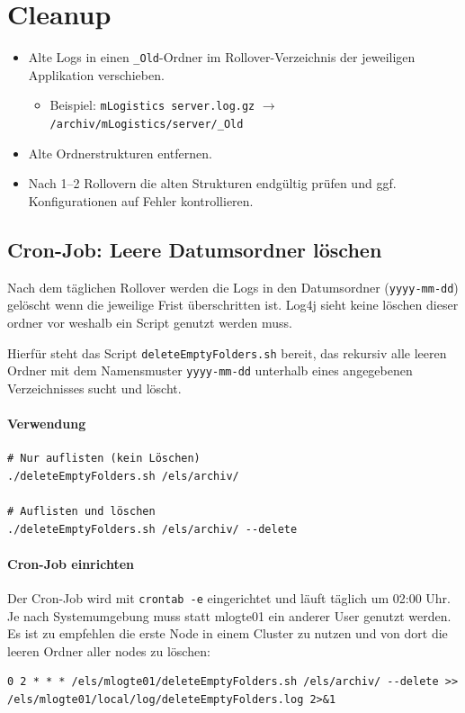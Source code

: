 \section{Cleanup}
\label{sec:cleanup}
\begin{itemize}
    \item Alte Logs in einen \texttt{\_Old}-Ordner im Rollover-Verzeichnis der jeweiligen Applikation verschieben.
    \begin{itemize}
        \item Beispiel: \texttt{mLogistics server.log.gz} $\rightarrow$ \texttt{/archiv/mLogistics/server/\_Old}
    \end{itemize}
    \item Alte Ordnerstrukturen entfernen.
    \item Nach 1–2 Rollovern die alten Strukturen endgültig prüfen und ggf. Konfigurationen auf Fehler kontrollieren.
\end{itemize}

\subsection{Cron-Job: Leere Datumsordner löschen}
Nach dem täglichen Rollover werden die Logs in den Datumsordner (\texttt{yyyy-mm-dd}) gelöscht wenn die jeweilige Frist überschritten ist.
Log4j sieht keine löschen dieser ordner vor weshalb ein Script genutzt werden muss.

Hierfür steht das Script \texttt{deleteEmptyFolders.sh} bereit, das rekursiv alle leeren Ordner
mit dem Namensmuster \texttt{yyyy-mm-dd} unterhalb eines angegebenen Verzeichnisses sucht und löscht.

\paragraph{Verwendung}
\begin{verbatim}
# Nur auflisten (kein Löschen)
./deleteEmptyFolders.sh /els/archiv/

# Auflisten und löschen
./deleteEmptyFolders.sh /els/archiv/ --delete
\end{verbatim}

\paragraph{Cron-Job einrichten}
Der Cron-Job wird mit \texttt{crontab -e} eingerichtet und läuft täglich um 02:00 Uhr. Je nach Systemumgebung muss statt mlogte01 ein anderer User genutzt werden. Es ist zu empfehlen die erste Node in einem Cluster zu nutzen und von dort die leeren Ordner aller nodes zu löschen:
\begin{verbatim}
0 2 * * * /els/mlogte01/deleteEmptyFolders.sh /els/archiv/ --delete >> /els/mlogte01/local/log/deleteEmptyFolders.log 2>&1
\end{verbatim}

